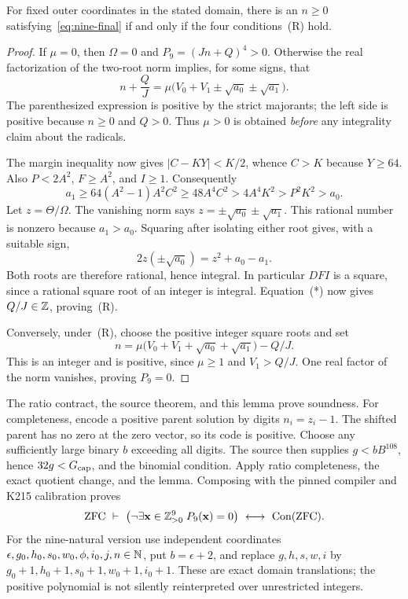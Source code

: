 \begin{lemma}
For fixed outer coordinates in the stated domain, there is an $n\geq0$
satisfying~\eqref{eq:nine-final} if and only if the four conditions~(R) hold.
\end{lemma}
\begin{proof}
If $\mu=0$, then $\Omega=0$ and $P_9=(Jn+Q)^4>0$. Otherwise the real
factorization of the two-root norm implies, for some signs, that
\[
 n+\frac QJ
 =\mu\bigl(V_0+V_1\pm\sqrt{a_0}\pm\sqrt{a_1}\bigr).       \tag{*}
\]
The parenthesized expression is positive by the strict majorants; the
left side is positive because $n\geq0$ and $Q>0$. Thus $\mu>0$ is obtained
\emph{before} any integrality claim about the radicals.

The margin inequality now gives $|C-KY|<K/2$, whence $C>K$ because
$Y\geq64$. Also $P<2A^2$, $F\geq A^2$, and $I\geq1$. Consequently
\[
 a_1\geq64(A^2-1)A^2C^2
       \geq48A^4C^2>4A^4K^2>P^2K^2>a_0.
\]
Let $z=\Theta/\Omega$. The vanishing norm says
$z=\pm\sqrt{a_0}\pm\sqrt{a_1}$. This rational number is nonzero because
$a_1>a_0$. Squaring after isolating either root gives, with a suitable sign,
\[
 2z(\pm\sqrt{a_0})=z^2+a_0-a_1.
\]
Both roots are therefore rational, hence integral. In particular $DFI$
is a square, since a rational square root of an integer is integral.
Equation~(*) now gives $Q/J\in\mathbb Z$, proving~(R).

Conversely, under~(R), choose the positive integer square roots and set
\[
 n=\mu\bigl(V_0+V_1+\sqrt{a_0}+\sqrt{a_1}\bigr)-Q/J.
\]
This is an integer and is positive, since $\mu\geq1$ and $V_1>Q/J$.
One real factor of the norm vanishes, proving $P_9=0$.
\end{proof}

The ratio contract, the source theorem, and this lemma prove soundness.
For completeness, encode a positive parent solution by digits $n_i=z_i-1$.
The shifted parent has no zero at the zero vector, so its code is positive.
Choose any sufficiently large binary $b$ exceeding all digits. The source
then supplies $g<bB^{108}$, hence $32g<G_{\rm cap}$, and the binomial
condition. Apply ratio completeness, the exact quotient change, and the
lemma. Composing with the pinned compiler and K215 calibration proves
\[
 \mathrm{ZFC}\ \vdash\
 \bigl(\neg\exists\mathbf x\in\mathbb Z_{>0}^9\;P_9(\mathbf x)=0\bigr)
 \ \longleftrightarrow\ \operatorname{Con}(\mathrm{ZFC}).
\]
For the nine-natural version use independent coordinates
$\epsilon,g_0,h_0,s_0,w_0,\phi,i_0,j,n\in\mathbb N$, put $b=\epsilon+2$, and
replace $g,h,s,w,i$ by $g_0+1,h_0+1,s_0+1,w_0+1,i_0+1$.
These are exact domain translations; the positive polynomial is not
silently reinterpreted over unrestricted integers.

